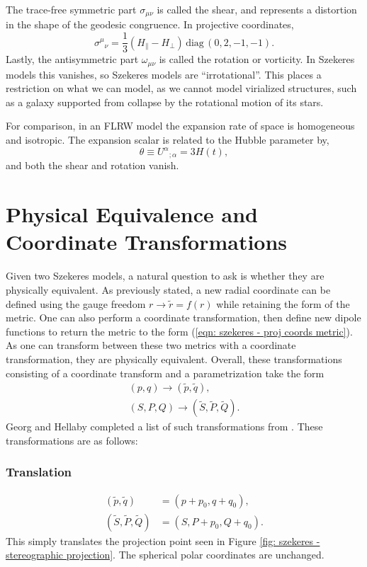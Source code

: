 \documentclass[a4paper,12pt]{report}
\begin{document}
The trace-free symmetric part $\sigma_{\mu\nu}$ is called the shear, and represents a distortion in the shape of the geodesic congruence. In projective coordinates,
\begin{equation}
  {\sigma^\mu}_\nu = \frac{1}{3}(H_\parallel - H_\perp)\,\text{diag}\,(0,2,-1,-1).
\end{equation}
Lastly, the antisymmetric part $\omega_{\mu\nu}$ is called the rotation or vorticity. In Szekeres models this vanishes, so Szekeres models are ``irrotational''. This places a restriction on what we can model, as we cannot model virialized structures, such as a galaxy supported from collapse by the rotational motion of its stars.

For comparison, in an FLRW model the expansion rate of space is homogeneous and isotropic. The expansion scalar is related to the Hubble parameter by,
\begin{equation}
  \theta \equiv {U^{\alpha}}_{;\alpha} = 3H(t),
\end{equation}
and both the shear and rotation vanish.

\section{Physical Equivalence and Coordinate Transformations}
Given two Szekeres models, a natural question to ask is whether they are physically equivalent. As previously stated, a new radial coordinate can be defined using the gauge freedom $r \to \tilde{r} = f(r)$ while retaining the form of the metric. One can also perform a coordinate transformation, then define new dipole functions to return the metric to the form (\ref{eqn: szekeres - proj coords metric}). As one can transform between these two metrics with a coordinate transformation, they are physically equivalent. Overall, these transformations consisting of a coordinate transform and a parametrization take the form
\begin{align}
  (p,q) \to (\tilde{p},\tilde{q}), \\
  (S,P,Q) \to (\tilde{S},\tilde{P},\tilde{Q}).
\end{align}
Georg and Hellaby \cite{RN8} completed a list of such transformations from \cite{RN73}. These transformations are as follows:

\subsubsection{Translation}
\begin{align}
  (\tilde{p},\tilde{q}) &= (p + p_0, q+q_0),\\
  (\tilde{S},\tilde{P},\tilde{Q}) &= (S, P+p_0, Q+q_0). \label{eqn: translation dipole function transformation}
\end{align}
This simply translates the projection point seen in Figure \ref{fig: szekeres - stereographic projection}. The spherical polar coordinates are unchanged.
\end{document}
